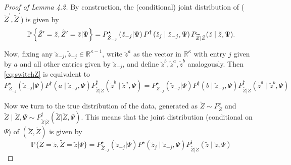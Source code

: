﻿\documentclass[12pt]{article}
\newcommand{\0}{\mbox{\bf 0}}
\theoremstyle{plain}%
\theoremstyle{definition}
\begin{document}
{\begin{proof}[Proof of Lemma  4.2]
By construction, the (conditional) joint distribution of ($\breve{Z}^{\prime
},\widetilde{Z}^{\prime }$) is given by 
\begin{equation*}
\mathbb{P}\left\{\breve{Z}^{\prime}=\breve{z},\widetilde{Z}^{\prime}= \tilde{%
z}|\Psi \right\} =P_{\breve{Z}_{-j}}^{\star }\left(\breve{z} _{-j}|\Psi
\right) P^{\dagger}\left(\breve{z}_{j}\mid \breve{z}_{-j},\Psi \right)P_{%
\widetilde{Z}|\breve{Z}}(\tilde{z}\mid \breve{z},\Psi).
\end{equation*}

Now, fixing any $\breve{z}_{-j},\tilde{z}_{-j}\in \mathbb{R}^{\kappa -1}$,
write $\breve{z}^{a}$ as the vector in $\mathbb{R}^{\kappa}$ with entry $j $
given by $a$ and all other entries given by $\breve{z}_{-j}$, and define $%
\breve{z}^{b},\tilde{z}^{a},\tilde{z}^{b}$ analogously. Then %
\eqref{eq:switchZ} is equivalent to 
\begin{equation}  \label{eq:distribution_switch}
P_{\breve{Z}_{-j}}^{\star }\left( \breve{z}_{-j}|\Psi \right) P^{\dagger
}\left(a\mid \breve{z}_{-j},\Psi\right)P_{\tilde{Z}|\breve{Z} }^{\dagger
}\left( \tilde{z}^{b}\mid\breve{z}^{a},\Psi \right)=P_{ \breve{Z}%
_{-j}}^{\star }\left( \breve{z}_{-j}|\Psi \right) P^{\dagger }\left(b\mid 
\breve{z}_{-j},\Psi \right)P_{\tilde{Z}|\breve{Z} }^{\dagger}\left( \tilde{z}%
^{a}\mid \breve{z}^{b},\Psi \right)
\end{equation}

Now we turn to the true distribution of the data, generated as $\breve{Z}
\sim P_{\breve{Z}}^{\star }$ and $\widetilde{Z}\mid \breve{Z},\Psi \sim P_{ 
\widetilde{Z}|\breve{Z}}^{\dagger }\left( \widetilde{Z}|\breve{Z},\Psi
\right) $. This means that the joint distribution (conditional on $\Psi $)
of $(\breve{Z},\widetilde{Z})$ is given by 
\begin{equation*}
\mathbb{P}\{\breve{Z}=\breve{z},\widetilde{Z}=\tilde{z}|\Psi \}=P_{ \breve{Z}%
_{-j}}^{\star }\left( \breve{z}_{-j}|\Psi \right) P^{\star }\left( \breve{z}%
_{j}\mid \breve{z}_{-j},\Psi \right) P_{\widetilde{Z}|\breve{Z} }^{\dagger }(%
\tilde{z}\mid \breve{z},\Psi )
\end{equation*}


\end{proof}}
\end{document}
